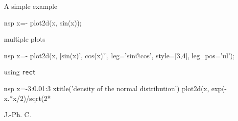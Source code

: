 \begin{examples}

\noindent A simple example

\begin{mintednsp}{nsp}
x=-%
plot2d(x, sin(x));
\end{mintednsp}

\noindent multiple plots

\begin{mintednsp}{nsp}
x=-%
plot2d(x, [sin(x)', cos(x)'], leg='sin@cos', style=[3,4], leg_pos='ul');
\end{mintednsp}

\noindent using \verb!rect!

\begin{mintednsp}{nsp}
x=-3:0.01:3
xtitle('density of the normal distribution')
plot2d(x, exp(-x.*x/2)/sqrt(2*%
\end{mintednsp}
\end{examples}

\begin{manseealso}
\end{manseealso}
\begin{authors}
  J.-Ph. C.
\end{authors}
